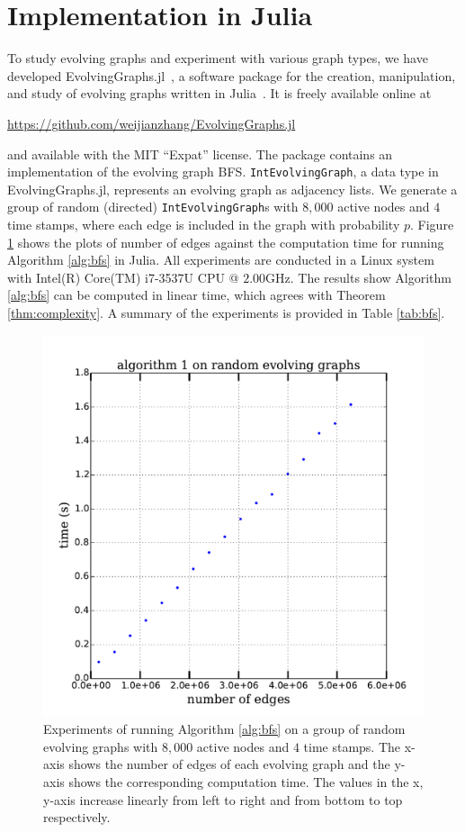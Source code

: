 \documentclass[10pt,conference,compsocconf]{IEEEtran}
\theoremstyle{definition}
\begin{document}
\section{Implementation in Julia}
\label{sec:implementation-julia}

To study evolving graphs and experiment with various graph types, we have
developed EvolvingGraphs.jl~\cite{zhang15}, a software package for the creation,
manipulation, and study of evolving graphs written in Julia~\cite{bkse12}.
It is freely available online at
\begin{center}
\url{https://github.com/weijianzhang/EvolvingGraphs.jl}
\end{center}
and available with the MIT ``Expat'' license. The package contains an implementation
of the evolving graph BFS. \texttt{IntEvolvingGraph}, a data type in EvolvingGraphs.jl,
represents an evolving graph as adjacency lists.
We generate a group of  random (directed) \texttt{IntEvolvingGraph}s with $8,000$ active nodes and $4$ time stamps, where each edge is included in the graph with
probability $p$.
 Figure \ref{fig:time} shows the plots of  number of edges against the computation time
for running Algorithm \ref{alg:bfs}
in Julia. All experiments are conducted 
in a Linux system with Intel(R) Core(TM) i7-3537U CPU @ $2.00$GHz.
The results show Algorithm \ref{alg:bfs} can be computed in linear time, which agrees
with Theorem \ref{thm:complexity}. A summary of the experiments is provided in Table \ref{tab:bfs}.
\begin{figure}[h]
  \centering
  \includegraphics[scale=0.44]{time.pdf}
  \caption{Experiments of running Algorithm \ref{alg:bfs}
on a group of random evolving graphs with $8,000$ active nodes and $4$ time stamps. The x-axis shows the
number of edges of each evolving graph and the y-axis shows the corresponding
computation time. The values in the x, y-axis increase linearly from left to 
right and from bottom to top respectively.}
  \label{fig:time}
\end{figure}
\end{document}
